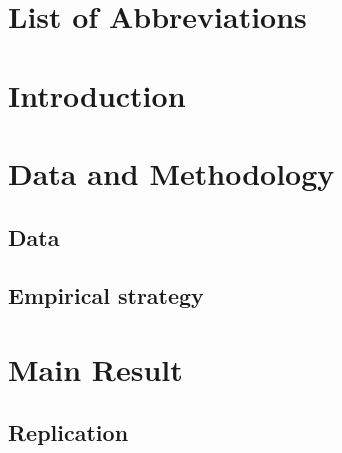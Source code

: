 \documentclass[12pt,a4paper]{article}
\begin{document}
\tableofcontents
\clearpage
{}
\section*{List of Abbreviations}


\clearpage
{}
\listoftables
{}
\listoffigures
\clearpage
{}  %

\section{Introduction}



\section{Data and Methodology}

\subsection{Data}



\subsection{Empirical strategy}



\section{Main Result}
\subsection{Replication}\label{sec:replication}

\end{document}
